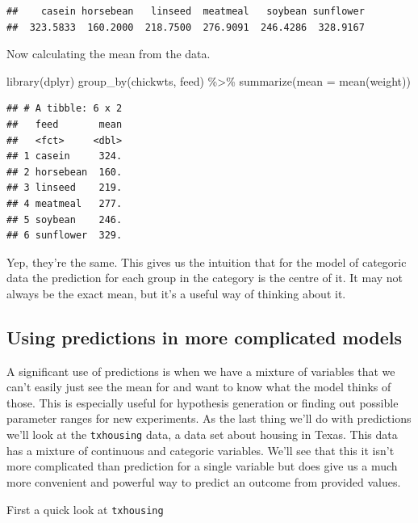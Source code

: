 \documentclass[
]{book}
\newenvironment{Shaded}{\begin{snugshade}}{\end{snugshade}}
\newcommand{\AttributeTok}[1]{\textcolor[rgb]{0.77,0.63,0.00}{#1}}
\newcommand{\FunctionTok}[1]{\textcolor[rgb]{0.00,0.00,0.00}{#1}}
\newcommand{\NormalTok}[1]{#1}
\newcommand{\SpecialCharTok}[1]{\textcolor[rgb]{0.00,0.00,0.00}{#1}}
\begin{document}
\begin{verbatim}
##    casein horsebean   linseed  meatmeal   soybean sunflower 
##  323.5833  160.2000  218.7500  276.9091  246.4286  328.9167
\end{verbatim}

Now calculating the mean from the data.

\begin{Shaded}
\begin{Highlighting}[]
\FunctionTok{library}\NormalTok{(dplyr)}
\FunctionTok{group\_by}\NormalTok{(chickwts, feed) }\SpecialCharTok{\%\textgreater{}\%} 
  \FunctionTok{summarize}\NormalTok{(}\AttributeTok{mean =} \FunctionTok{mean}\NormalTok{(weight)) }
\end{Highlighting}
\end{Shaded}

\begin{verbatim}
## # A tibble: 6 x 2
##   feed       mean
##   <fct>     <dbl>
## 1 casein     324.
## 2 horsebean  160.
## 3 linseed    219.
## 4 meatmeal   277.
## 5 soybean    246.
## 6 sunflower  329.
\end{verbatim}

Yep, they're the same. This gives us the intuition that for the model of categoric data the prediction for each group in the category is the centre of it. It may not always be the exact mean, but it's a useful way of thinking about it.

\hypertarget{using-predictions-in-more-complicated-models}{%
\subsection{Using predictions in more complicated models}\label{using-predictions-in-more-complicated-models}}

A significant use of predictions is when we have a mixture of variables that we can't easily just see the mean for and want to know what the model thinks of those. This is especially useful for hypothesis generation or finding out possible parameter ranges for new experiments. As the last thing we'll do with predictions we'll look at the \texttt{txhousing} data, a data set about housing in Texas. This data has a mixture of continuous and categoric variables. We'll see that this it isn't more complicated than prediction for a single variable but does give us a much more convenient and powerful way to predict an outcome from provided values.

First a quick look at \texttt{txhousing}
\end{document}
